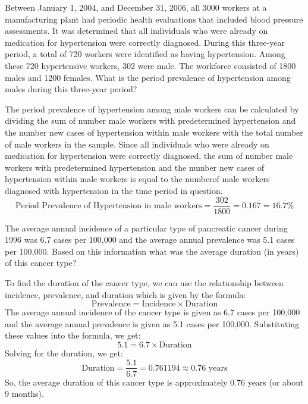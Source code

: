 \documentclass[a4paper]{exam}
\begin{document}
\begin{questions}
\begin{solution}
    \end{solution}

    \question[10]
    Between January 1, 2004, and December 31, 2006, all 3000 workers at a manufacturing plant had periodic health evaluations that included blood pressure assessments. It was determined that all individuals who were already on medication for hypertension were correctly diagnosed. During this three-year period, a total of 720 workers were identified as having hypertension. Among these 720 hypertensive workers, 302 were male. The workforce consisted of 1800 males and 1200 females. What is the period prevalence of hypertension among males during this three-year period?

    \begin{solution}
        The period prevalence of hypertension among male workers can be calculated by dividing the sum of number male workers with predetermined hypertension and the number new cases of hypertension within male workers with the total number of male workers in the sample.
        Since all individuals who were already on medication for hypertension were correctly diagnosed, the sum of number male workers with predetermined hypertension and the number new cases of hypertension within male workers is equal to the numberof male workers diagnosed with hypertension in the time period in question.
        \begin{equation*}
            \text{Period Prevalence of Hypertension in male workers} = \frac{302}{1800} = 0.16\overline{7} = 16.\overline{7}\%
        \end{equation*}
    \end{solution}

    \question[10]
    The average annual incidence of a particular type of pancreatic cancer during 1996 was 6.7 cases per 100,000 and the average annual prevalence was 5.1 cases per 100,000. Based on this information what was the average duration (in years) of this cancer type?

    \begin{solution}
        To find the duration of the cancer type, we can use the relationship between incidence, prevalence, and duration which is given by the formula:
        \begin{equation*}
            \text{Prevalence} = \text{Incidence} \times \text{Duration}
        \end{equation*}
        The average annual incidence of the cancer type is given as 6.7 cases per 100,000 and the average annual prevalence is given as 5.1 cases per 100,000. Substituting these values into the formula, we get:
        \begin{equation*}
            5.1 = 6.7 \times \text{Duration}
        \end{equation*}
        Solving for the duration, we get:
        \begin{equation*}
            \text{Duration} = \frac{5.1}{6.7} = 0.761194 \approx 0.76 \text{ years}
        \end{equation*}
        So, the average duration of this cancer type is approximately 0.76 years (or about 9 months).
    \end{solution}


\end{questions}
\end{document}
